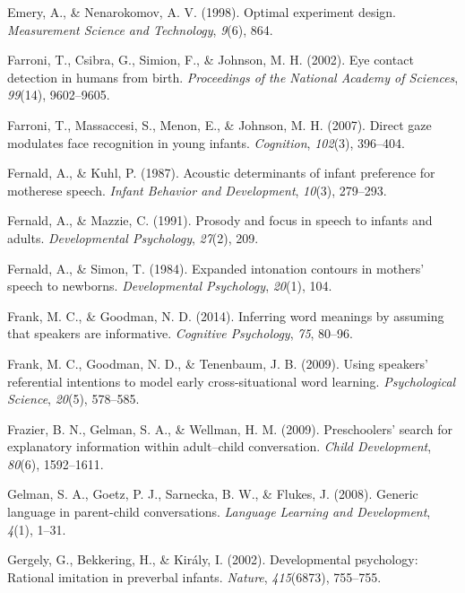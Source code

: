 \documentclass[english,man]{apa6}
\theoremstyle{definition}
\theoremstyle{definition}
\theoremstyle{definition}
\theoremstyle{remark}
\begin{document}
\hypertarget{ref-emery1998optimal}{}
Emery, A., \& Nenarokomov, A. V. (1998). Optimal experiment design.
\emph{Measurement Science and Technology}, \emph{9}(6), 864.

\hypertarget{ref-farroni2002eye}{}
Farroni, T., Csibra, G., Simion, F., \& Johnson, M. H. (2002). Eye
contact detection in humans from birth. \emph{Proceedings of the
National Academy of Sciences}, \emph{99}(14), 9602--9605.

\hypertarget{ref-farroni2007direct}{}
Farroni, T., Massaccesi, S., Menon, E., \& Johnson, M. H. (2007). Direct
gaze modulates face recognition in young infants. \emph{Cognition},
\emph{102}(3), 396--404.

\hypertarget{ref-fernald1987acoustic}{}
Fernald, A., \& Kuhl, P. (1987). Acoustic determinants of infant
preference for motherese speech. \emph{Infant Behavior and Development},
\emph{10}(3), 279--293.

\hypertarget{ref-fernald1991prosody}{}
Fernald, A., \& Mazzie, C. (1991). Prosody and focus in speech to
infants and adults. \emph{Developmental Psychology}, \emph{27}(2), 209.

\hypertarget{ref-fernald1984expanded}{}
Fernald, A., \& Simon, T. (1984). Expanded intonation contours in
mothers' speech to newborns. \emph{Developmental Psychology},
\emph{20}(1), 104.

\hypertarget{ref-frank2014inferring}{}
Frank, M. C., \& Goodman, N. D. (2014). Inferring word meanings by
assuming that speakers are informative. \emph{Cognitive Psychology},
\emph{75}, 80--96.

\hypertarget{ref-frank2009using}{}
Frank, M. C., Goodman, N. D., \& Tenenbaum, J. B. (2009). Using
speakers' referential intentions to model early cross-situational word
learning. \emph{Psychological Science}, \emph{20}(5), 578--585.

\hypertarget{ref-frazier2009preschoolers}{}
Frazier, B. N., Gelman, S. A., \& Wellman, H. M. (2009). Preschoolers'
search for explanatory information within adult--child conversation.
\emph{Child Development}, \emph{80}(6), 1592--1611.

\hypertarget{ref-gelman2008generic}{}
Gelman, S. A., Goetz, P. J., Sarnecka, B. W., \& Flukes, J. (2008).
Generic language in parent-child conversations. \emph{Language Learning
and Development}, \emph{4}(1), 1--31.

\hypertarget{ref-gergely2002developmental}{}
Gergely, G., Bekkering, H., \& Király, I. (2002). Developmental
psychology: Rational imitation in preverbal infants. \emph{Nature},
\emph{415}(6873), 755--755.
\end{document}
